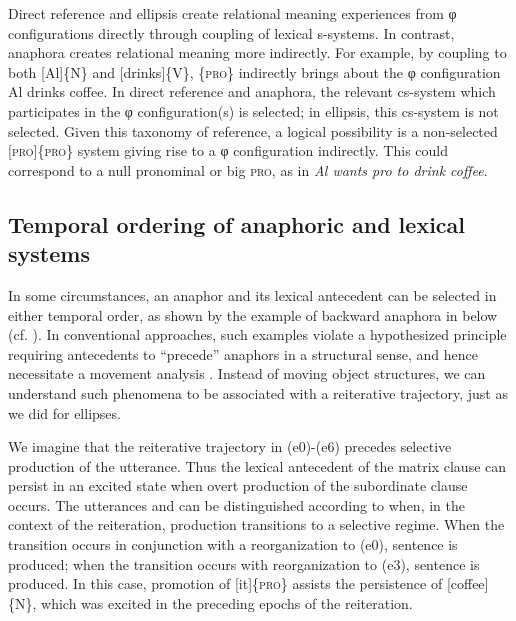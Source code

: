 Direct reference and ellipsis create relational meaning experiences from φ configurations directly through coupling of lexical s-systems. In contrast, anaphora creates relational meaning more indirectly. For example, by coupling to both [Al]\{N\} and [drinks]\{V\}, \{\textsc{pro}\} indirectly brings about the φ configuration {\textbar}Al drinks coffee{\textbar}. In direct reference and anaphora, the relevant cs-system which participates in the φ configuration(s) is selected; in ellipsis, this cs-system is not selected. Given this taxonomy of reference, a logical possibility is a non-selected [\textsc{pro}]\{\textsc{pro}\} system giving rise to a φ configuration indirectly. This could correspond to a null pronominal or big \textsc{pro}, as in \textit{Al wants pro to drink coffee}.

\subsection{Temporal ordering of anaphoric and lexical systems}

In some circumstances, an anaphor and its lexical antecedent can be selected in either temporal order, as shown by the example of backward anaphora in  below (cf. \citealt{KazaninaEtAl2007,ReulandAvrutin2005}). In conventional approaches, such examples violate a hypothesized principle requiring antecedents to “precede” anaphors in a structural sense, and hence necessitate a movement analysis \citep{Chomsky1993}. Instead of moving object structures, we can understand such phenomena to be associated with a reiterative trajectory, just as we did for ellipses.

  We imagine that the reiterative trajectory in (e0)-(e6) precedes selective production of the utterance. Thus the lexical antecedent of the matrix clause can persist in an excited state when overt production of the subordinate clause occurs. The utterances  and  can be distinguished according to when, in the context of the reiteration, production transitions to a selective regime. When the transition occurs in conjunction with a reorganization to (e0), sentence  is produced; when the transition occurs with reorganization to (e3), sentence  is produced. In this case, promotion of [it]\{\textsc{pro}\} assists the persistence of [coffee]\{N\}, which was excited in the preceding epochs of the reiteration.

\ea
{}
\z
\z
  
